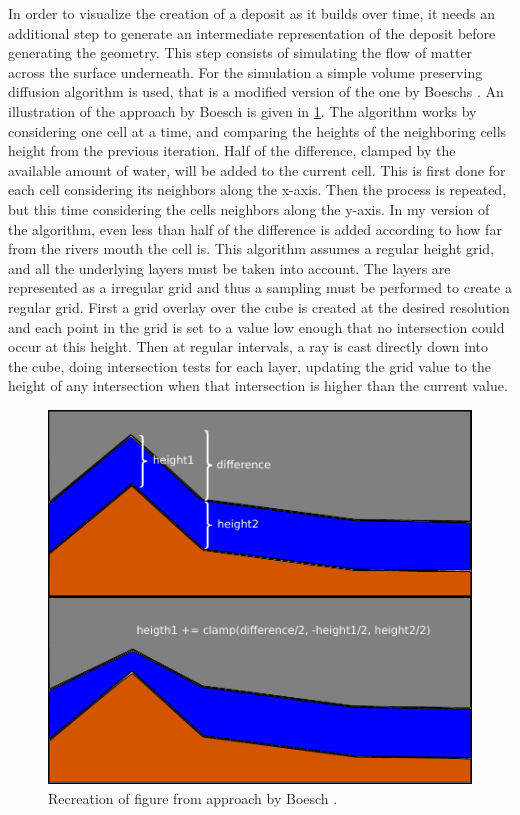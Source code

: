\documentclass[a4paper,12pt]{report}
\begin{document}
In order to visualize the creation of a deposit as it builds over time, it needs an additional step to generate an intermediate representation of the deposit before generating the geometry. This step consists of simulating the flow of matter across the surface underneath. For the simulation a simple volume preserving diffusion algorithm is used, that is a modified version of the one by Boeschs \cite{Boesch:2011:Online}. An illustration of the approach by Boesch is given in \ref{fig:boesch}. The algorithm works by considering one cell at a time, and comparing the heights of the neighboring cells height from the previous iteration. Half of the difference, clamped by the available amount of water, will be added to the current cell. This is first done for each cell considering its neighbors along the x-axis. Then the process is repeated, but this time considering the cells neighbors along the y-axis.  In my version of the algorithm, even less than half of the difference is added according to how far from the 
rivers mouth the cell is.  This algorithm assumes a regular height grid, and all the underlying layers must be taken into account. The layers are represented as a irregular grid and thus a sampling must be performed to create a regular grid. First a grid overlay over the cube is created at the desired resolution and each point in the grid is set to a value low enough that no intersection could occur at this height. Then at regular intervals, a ray is cast directly down into the cube, doing intersection tests for each layer, updating the grid value to the height of any intersection when that intersection is higher than the 
current value.
\begin{figure}
 \includegraphics[width=\linewidth]{thesis/diffuse.pdf}
 \caption{Recreation of figure from approach by Boesch \cite{Boesch:2011:Online}.}
 \label{fig:boesch}
\end{figure}
\end{document}
